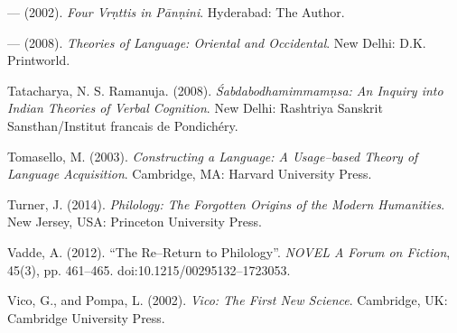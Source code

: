 \begin{thebibliography}{99}
  — (2002). \textit{Four Vrṇttis in Pānṇini}. Hyderabad: The Author.

  — (2008). \textit{Theories of Language: Oriental and Occidental}. New Delhi: D.K. Printworld.

  Tatacharya, N. S. Ramanuja. (2008). \textit{Śabdabodhamimmamṇsa: An Inquiry into Indian Theories of Verbal Cognition}. New Delhi: Rashtriya Sanskrit Sansthan/Institut francais de Pondichéry.

  Tomasello, M. (2003). \textit{Constructing a Language: A Usage–based Theory of Language Acquisition}. Cambridge, MA: Harvard University Press.

  Turner, J. (2014). \textit{Philology: The Forgotten Origins of the Modern Humanities}. New Jersey, USA: Princeton University Press.

  Vadde, A. (2012). “The Re–Return to Philology”. \textit{NOVEL A Forum on Fiction}, 45(3), pp. 461–465. doi:10.1215/00295132–1723053.

  Vico, G., and Pompa, L. (2002). \textit{Vico: The First New Science}. Cambridge, UK: Cambridge University Press.

 \end{thebibliography}

\theendnotes

